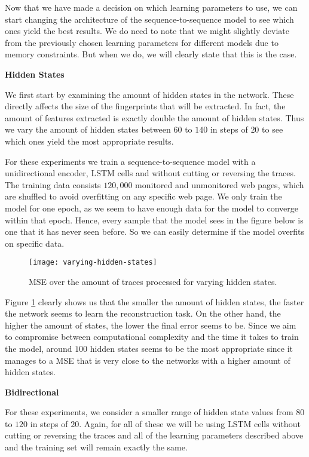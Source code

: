 Now that we have made a decision on which learning parameters to use, we can start changing the architecture of the sequence-to-sequence model to see which ones yield the best results.
We do need to note that we might slightly deviate from the previously chosen learning parameters for different models due to memory constraints.
But when we do, we will clearly state that this is the case.

\noindent
\textbf{Hidden States}

We first start by examining the amount of hidden states in the network.
These directly affects the size of the fingerprints that will be extracted.
In fact, the amount of features extracted is exactly double the amount of hidden states.
Thus we vary the amount of hidden states between $60$ to $140$ in steps of $20$ to see which ones yield the most appropriate results.

For these experiments we train a sequence-to-sequence model with a unidirectional encoder, LSTM cells and without cutting or reversing the traces.
The training data consists $120,000$ monitored and unmonitored web pages, which are shuffled to avoid overfitting on any specific web page.
We only train the model for one epoch, as we seem to have enough data for the model to converge within that epoch.
Hence, every sample that the model sees in the figure below is one that it has never seen before.
So we can easily determine if the model overfits on specific data.

\begin{figure}[ht]
  \centering
  \texttt{[image: varying-hidden-states]}
  \caption{MSE over the amount of traces processed for varying hidden states.}
  \label{fig:varying-hidden-states}
\end{figure}

Figure \ref{fig:varying-hidden-states} clearly shows us that the smaller the amount of hidden states, the faster the network seems to learn the reconstruction task.
On the other hand, the higher the amount of states, the lower the final error seems to be.
Since we aim to compromise between computational complexity and the time it takes to train the model, around $100$ hidden states seems to be the most appropriate since it manages to a MSE that is very close to the networks with a higher amount of hidden states.

\noindent
\textbf{Bidirectional}

For these experiments, we consider a smaller range of hidden state values from $80$ to $120$ in steps of $20$.
Again, for all of these we will be using LSTM cells without cutting or reversing the traces and all of the learning parameters described above and the training set will remain exactly the same.

